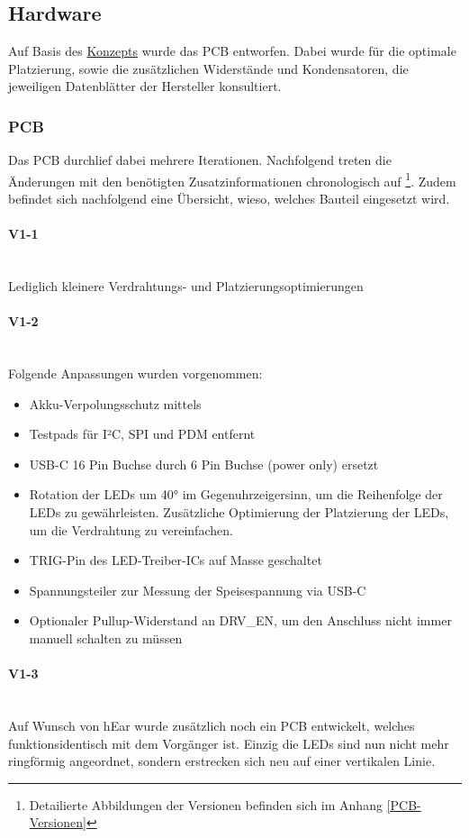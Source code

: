 \documentclass[12pt]{article}
\begin{document}
	\subsection{Hardware}
	Auf Basis des \hyperref[Konzept]{Konzepts} wurde das PCB entworfen. Dabei wurde für die optimale Platzierung, sowie die zusätzlichen Widerstände und Kondensatoren, die jeweiligen Datenblätter der Hersteller konsultiert.
	\subsubsection{PCB}
	Das PCB durchlief dabei mehrere Iterationen. Nachfolgend treten die Ände\-rungen mit den benötigten Zusatzinformationen chronologisch auf \footnote{Detailierte Abbildungen der Versionen befinden sich im Anhang \ref{PCB-Versionen}}. Zudem befindet sich nachfolgend eine Übersicht, wieso, welches Bauteil eingesetzt wird.
	\paragraph{V1-1}\mbox{}\\
	Lediglich kleinere Verdrahtungs- und Platzierungsoptimierungen
	\paragraph{V1-2}\mbox{}\\
	Folgende Anpassungen wurden vorgenommen:
	\begin{itemize}
		\item Akku-Verpolungsschutz mittels 
		\item Testpads für I²C, SPI und PDM entfernt
		\item USB-C 16 Pin Buchse durch 6 Pin Buchse (power only) ersetzt
		\item Rotation der LEDs um 40° im Gegenuhrzeigersinn, um die Reihenfolge der LEDs zu gewährleisten. Zusätzliche Optimierung der Platzierung der LEDs, um die Verdrahtung zu vereinfachen.
		\item TRIG-Pin des LED-Treiber-ICs auf Masse geschaltet
		\item Spannungsteiler zur Messung der Speisespannung via USB-C
		\item Optionaler Pullup-Widerstand an DRV\_EN, um den Anschluss nicht immer manuell schalten zu müssen
	\end{itemize}
	\paragraph{V1-3}\mbox{}\\
	Auf Wunsch von hEar wurde zusätzlich noch ein PCB entwickelt, welches funktionsidentisch mit dem Vorgänger ist. Einzig die LEDs sind nun nicht mehr ringförmig angeordnet, sondern erstrecken sich neu auf einer vertikalen Linie.
\end{document}
